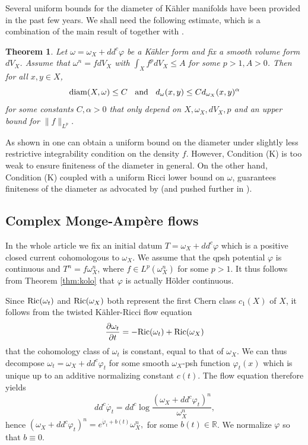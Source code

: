\documentclass[a4paper,11pt,leqno,english]{smfart}
\theoremstyle{plain}
\newtheorem{thm}{Theorem}[section]
\theoremstyle{plain}
\numberwithin{equation}{section} %
\numberwithin{figure}{section} %
\theoremstyle{plain}
\theoremstyle{plain}
\theoremstyle{remark}
\theoremstyle{remark}
\theoremstyle{definition}
\theoremstyle{plain}
\theoremstyle{plain}
\theoremstyle{definition}
\newcommand{\R}{{\mathbb{R}}}
\newcommand{\f}{\varphi}
\begin{document}
  Several uniform bounds for the diameter of K\"ahler manifolds have been provided in
  the past few years.
  We shall need the following estimate, which is a combination of 
  the main result of \cite{Kol08, DDGHKZ14} together with \cite[Theorem 4.1]{Li21}.
  
  
  \begin{thm} \label{thm:diameter}
  Let $\omega=\omega_X+dd^c \f$ be a K\"ahler form 
  and fix a smooth volume form $dV_X$.
  Assume that $\omega^n=f dV_X$ with
  $\int_X f^p dV_X\leq A$ for some $p>1,A>0$. Then for all $x,y \in X$,
  $$
  {\rm diam}(X,{\omega}) \leq C
  \; \; \text{ and } \; \;
d_{{\omega}} (x,y) \leq C d_{\omega_X}(x,y)^{\alpha}
  $$
  for some constants $C,\alpha>0$ that only depend on $X,\omega_X,dV_X,p$ and 
 an upper bound for  $\|f\|_{L^p}$.
  \end{thm}
  
  As shown in \cite{GPSS24,GGZ25} one can obtain a uniform bound on the diameter
  under slightly less restrictive integrability condition on the density $f$. However, Condition (K) is too weak to ensure finiteness of the diameter in general.
    On the other hand, Condition (K) coupled with a uniform Ricci lower bound on $\omega$,
  guarantees finiteness of the diameter as advocated by \cite{FGS20}
  (and pushed further in \cite[Theorem A]{GGZ25}).
 
    
    
 
 
 \subsection{Complex Monge-Amp\`ere flows}\label{cx-MA-flow}
 
 In the whole article we fix an initial datum $T=\omega_X+dd^c \f$ which is 
 a positive closed current cohomologous to $\omega_X$.
 We assume that the qpsh potential $\f$ is continuous and 
 $T^n=f \omega_X^n$, where $f \in L^p(\omega_X^n)$ for some $p>1$. It thus follows from 
 Theorem \ref{thm:kolo} that $\f$ is actually H\"older continuous.
 
 
 
 Since ${\rm Ric}(\omega_t)$ and ${\rm Ric}(\omega_X)$ both represent the first Chern class
$c_1(X)$  of $X$, it follows from the twisted K\"ahler-Ricci flow equation
  $$
\frac{\partial \omega_t}{\partial t}=-{\rm Ric}(\omega_t)+{\rm Ric}(\omega_X)
$$
 that the cohomology class of $\omega_t$ is constant, equal to  that
 of $\omega_X$. We can thus decompose $\omega_t=\omega_X+dd^c \f_t$ for some
 smooth $\omega_X$-psh function $\f_t(x)$ which is unique up to an additive normalizing constant
 $c(t)$. The flow equation therefore yields
 $$
 dd^c \dot{\f_t}=dd^c \log \frac{(\omega_X+dd^c \f_t)^n}{\omega_X^n},
 $$
 hence 
 $
 (\omega_X+dd^c \f_t)^n=e^{\dot{\f}_t+b(t)} \omega_X^n,
 $
 for some   $b(t) \in \R$. We normalize $\f$   so that $b \equiv 0$.
 
\end{document}
